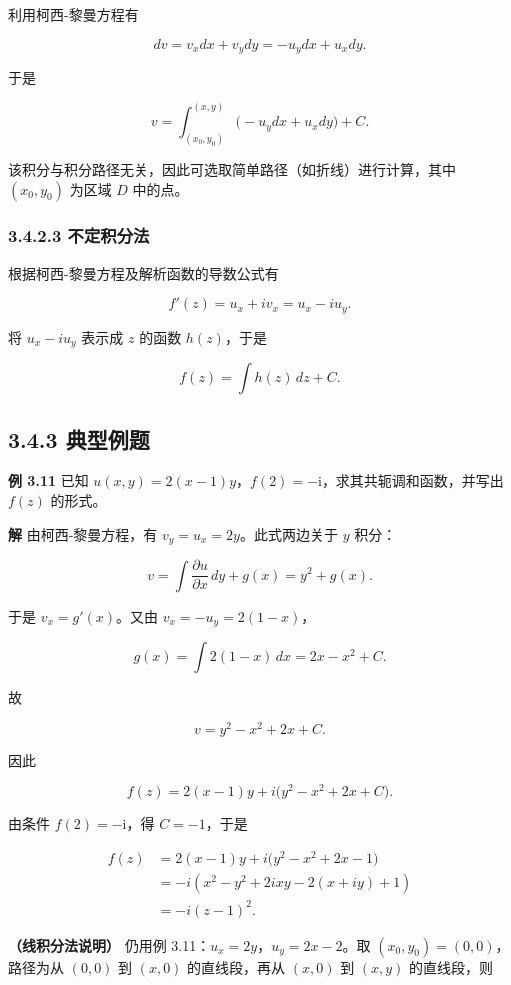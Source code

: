 利用柯西-黎曼方程有

\[
dv=v_x dx+v_y dy=-u_y dx+u_x dy .
\]

于是

\[
v=\int_{(x_0,y_0)}^{(x,y)}\bigl(-u_y dx+u_x dy\bigr)+C .
\]

该积分与积分路径无关，因此可选取简单路径（如折线）进行计算，其中
\((x_0,y_0)\) 为区域 \(D\) 中的点。

\subsubsection{3.4.2.3 不定积分法}\label{ux4e0dux5b9aux79efux5206ux6cd5}

根据柯西-黎曼方程及解析函数的导数公式有

\[
f'(z)=u_x+iv_x=u_x-iu_y .
\]

将 \(u_x-iu_y\) 表示成 \(z\) 的函数 \(h(z)\)，于是

\[
f(z)=\int h(z)\,dz+C .
\]

\subsection{3.4.3 典型例题}\label{ux5178ux578bux4f8bux9898-1}

\textbf{例 3.11} 已知
\(u(x,y)=2(x-1)y\)，\(f(2)=-\mathrm{i}\)，求其共轭调和函数，并写出
\(f(z)\) 的形式。

\textbf{解} 由柯西-黎曼方程，有 \(v_y=u_x=2y\)。此式两边关于 \(y\)
积分：

\[
v=\int\frac{\partial u}{\partial x}\,dy+g(x)=y^2+g(x).
\]

于是 \(v_x=g'(x)\)。又由 \(v_x=-u_y=2(1-x)\)，

\[
g(x)=\int2(1-x)\,dx=2x-x^2+C .
\]

故

\[
v=y^2-x^2+2x+C .
\]

因此

\[
f(z)=2(x-1)y+i\bigl(y^2-x^2+2x+C\bigr).
\]

由条件 \(f(2)=-\mathrm{i}\)，得 \(C=-1\)，于是

\[
\begin{aligned}
f(z)&=2(x-1)y+i\bigl(y^2-x^2+2x-1\bigr)\\
&=-i(x^2-y^2+2ixy-2(x+iy)+1)\\
&=-i(z-1)^2 .
\end{aligned}
\]

\textbf{（线积分法说明）} 仍用例 3.11：\(u_x=2y\)，\(u_y=2x-2\)。取
\((x_0,y_0)=(0,0)\)，路径为从 \((0,0)\) 到 \((x,0)\) 的直线段，再从
\((x,0)\) 到 \((x,y)\) 的直线段，则

